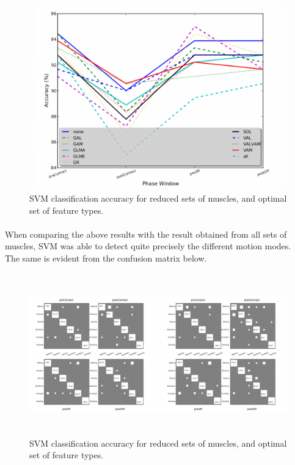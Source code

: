 \documentclass[12pt]{article}
\begin{document}
\begin{figure}[H]
	\begin{center}
		\includegraphics[height=8cm,width=14cm]{AccuracyReducedMuscles}
	\end{center}
	\caption{SVM classification accuracy for reduced sets of muscles, and optimal set of feature types.}
\end{figure}


\paragraph{}
When comparing the above results with the result obtained from all sets of muscles,
SVM was able to detect quite precisely the different motion modes.\\ The same is evident from the confusion matrix below.


\begin{figure}[H]
	\begin{center}
		\includegraphics[height=7cm,width=15cm]{ConfusionMatrix}
	\end{center}
	\caption{SVM classification accuracy for reduced sets of muscles, and optimal set of feature types.}
\end{figure}
\end{document}
